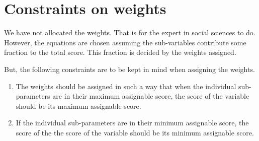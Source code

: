 \documentclass[oneside]{article}
\begin{document}
\section{Constraints on weights}
We have not allocated the weights. That is for the expert
in social sciences to do. However, the equations are chosen
assuming the sub-variables contribute some fraction to the
total score. This fraction is decided by the weights assigned.

But, the following constraints are to be kept in mind when
assigning the weights.
\begin{enumerate}
\item The weights should be assigned in such a way that when
the individual sub-parameters are in their maximum assignable
score, the score of the variable should be its maximum
assignable score.
\item If the individual sub-parameters are in their minimum
assignable score, the score of the the score of the variable
should be its minimum assignable score.
\end{enumerate}
\end{document}

